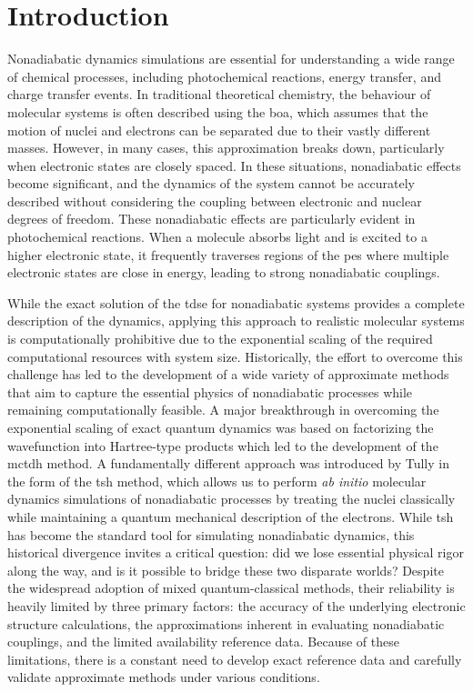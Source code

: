 \chapter{Introduction}
Nonadiabatic dynamics simulations are essential for understanding a wide range of chemical processes, including photochemical reactions, energy transfer, and charge transfer events. In traditional theoretical chemistry, the behaviour of molecular systems is often described using the \gls{boa}, which assumes that the motion of nuclei and electrons can be separated due to their vastly different masses. However, in many cases, this approximation breaks down, particularly when electronic states are closely spaced. In these situations, nonadiabatic effects become significant, and the dynamics of the system cannot be accurately described without considering the coupling between electronic and nuclear degrees of freedom. These nonadiabatic effects are particularly evident in photochemical reactions. When a molecule absorbs light and is excited to a higher electronic state, it frequently traverses regions of the \gls{pes} where multiple electronic states are close in energy, leading to strong nonadiabatic couplings.\supercite{acs.chemrev.7b00577}

While the exact solution of the \gls{tdse} for nonadiabatic systems provides a complete description of the dynamics, applying this approach to realistic molecular systems is computationally prohibitive due to the exponential scaling of the required computational resources with system size. Historically, the effort to overcome this challenge has led to the development of a wide variety of approximate methods that aim to capture the essential physics of nonadiabatic processes while remaining computationally feasible. A major breakthrough in overcoming the exponential scaling of exact quantum dynamics was based on factorizing the wavefunction into Hartree-type products which led to the development of the \gls{mctdh} method.\supercite{10.1016/0009-2614!90!87014-I} A fundamentally different approach was introduced by Tully in the form of the \gls{tsh} method,\supercite{10.1063/1.459170} which allows us to perform \textit{ab initio} molecular dynamics simulations of nonadiabatic processes by treating the nuclei classically while maintaining a quantum mechanical description of the electrons. While \gls{tsh} has become the standard tool for simulating nonadiabatic dynamics, this historical divergence invites a critical question: did we lose essential physical rigor along the way, and is it possible to bridge these two disparate worlds? Despite the widespread adoption of mixed quantum-classical methods, their reliability is heavily limited by three primary factors: the accuracy of the underlying electronic structure calculations, the approximations inherent in evaluating nonadiabatic couplings, and the limited availability reference data. Because of these limitations, there is a constant need to develop exact reference data and carefully validate approximate methods under various conditions.

